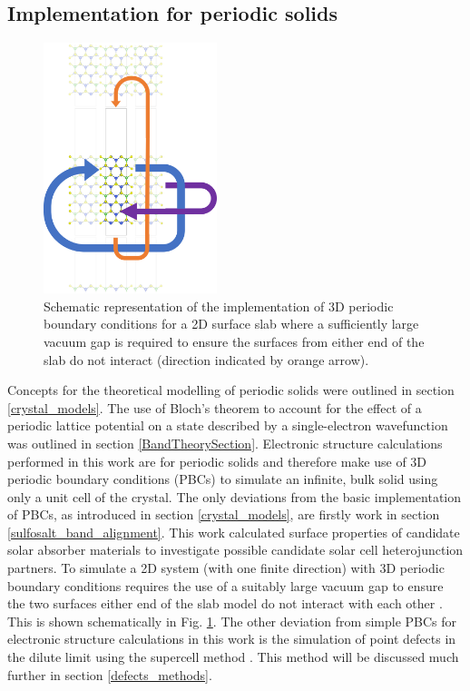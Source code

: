\documentclass[11pt, twoside]{report}
\begin{document}


\subsection{Implementation for periodic solids}
\begin{figure}[h!]
  \centering
    \includegraphics[width=0.45\textwidth]{figures/slab_PBCs.png}
    \caption{Schematic representation of the implementation of 3D periodic boundary conditions for a 2D surface slab where a sufficiently large vacuum gap is required to ensure the surfaces from either end of the slab do not interact (direction indicated by orange arrow).}
  \label{slab_PBCs}
\end{figure}
Concepts for the theoretical modelling of periodic solids were outlined in section \ref{crystal_models}. The use of Bloch's theorem to account for the effect of a periodic lattice potential on a state described by a single-electron wavefunction was outlined in section \ref{BandTheorySection}. Electronic structure calculations performed in this work are for periodic solids and therefore make use of 3D periodic boundary conditions (PBCs) to simulate an infinite, bulk solid using only a unit cell of the crystal. The only deviations from the basic implementation of PBCs, as introduced in section \ref{crystal_models}, are firstly work in section \ref{sulfosalt_band_alignment}. This work calculated surface properties of candidate solar absorber materials to investigate possible candidate solar cell heterojunction partners. To simulate a 2D system (with one finite direction) with 3D periodic boundary conditions requires the use of a suitably large vacuum gap to ensure the two surfaces either end of the slab model do not interact with each other \cite{Prasad_ch6}. This is shown schematically in Fig. \ref{slab_PBCs}. The other deviation from simple PBCs for electronic structure calculations in this work is the simulation of point defects in the dilute limit using the supercell method \cite{SupercellMethodDefects}. This method will be discussed much further in section \ref{defects_methods}. 
\end{document}
